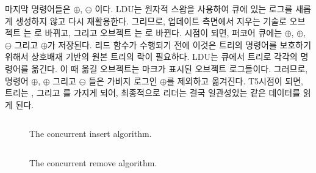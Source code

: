 마지막 명령어들은 $\oplus$, $\ominus$ 이다. 
LDU는 원자적 스왑을 사용하여 큐에 있는 로그를 새롭게 생성하지 않고 다시 재활용한다. 
그리므로, 업데이트 측면에서 지우는 기술로
 오브젝트 는 로 바뀌고, 그리고 오브젝트 는
로 바뀐다. 
 시점이 되면, 퍼코어 큐에는 $\oplus$, $\oplus$, $\ominus$ 
그리고 $\oplus$가 저장된다. 
리드 함수가 수행되기 전에 이것은 트리의 명령어를 보호하기 위해서
상호배재 기반의 원본 트리의 락이 필요하다. 
LDU는 큐에서 트리로 각각의 명령어를 옮긴다. 이 때 옮길 오브젝트는 마크가 표시된 
오브젝트 로그들이다.
그러므로, 명령어 $\oplus$, $\oplus$ 그리고 $\ominus$
들은 가비지 로그인 $\oplus$를 제외하고 옮겨진다. 
T5시점이 되면, 트리는 ,  그리고 를 가지게 되어, 
최종적으로 리더는 결국 일관성있는 같은 데이터를 읽게 된다. 

\begin{figure}[h]
\begin{center}
\inputminted[linenos,fontsize=\footnotesize, tabsize=2]{c}{src/ldu_logical_a.c}
\end{center}
\caption{The \LDU concurrent insert algorithm. }
\label{fig:gldulogicalupdate}
\end{figure}


\begin{figure}[h]
\begin{center}
\inputminted[linenos,fontsize=\footnotesize, tabsize=2]{c}{src/ldu_logical_b.c}
\end{center}
\caption{The \LDU concurrent remove algorithm.}
\label{fig:gldulogicalupdate}
\end{figure}


